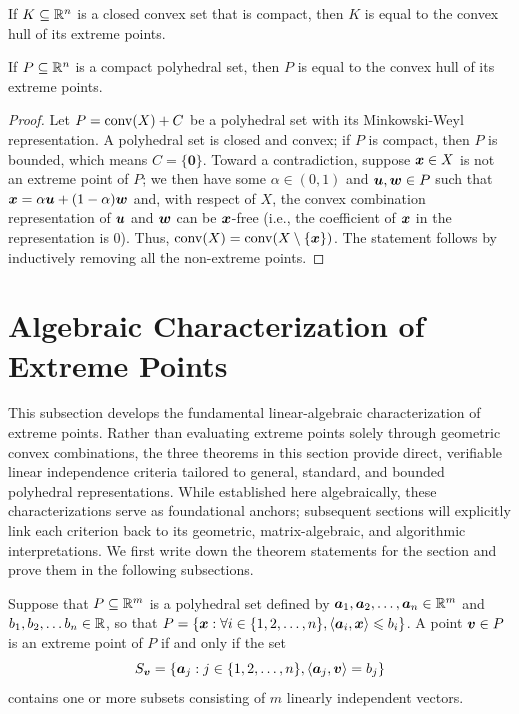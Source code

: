 \begin{proposition}
If $K\subseteq \mathbb R^n$ is a closed convex set that is compact, then $K$ is equal to the convex hull of its extreme points.
\end{proposition}
\begin{corollary}
If $P\subseteq \mathbb R^n$ is a compact polyhedral set, then $P$ is equal to the convex hull of its extreme points.
\end{corollary}
\begin{proof}
Let $P = \operatorname{conv}(X) + C$ be a polyhedral set with its Minkowski-Weyl representation. A polyhedral set is closed and convex; if $P$ is compact, then $P$ is bounded, which means $C = \{\bm0\}$. Toward a contradiction, suppose ${\boldsymbol x} \in X$ is not an extreme point of $P$; we then have some $\alpha\in(0,1)$ and ${\boldsymbol u}, {\boldsymbol w} \in P$ such that ${\boldsymbol x} = \alpha {\boldsymbol u} + (1-\alpha){\boldsymbol w}$ and, with respect of $X$, the convex combination representation of ${\boldsymbol u}$ and ${\boldsymbol w}$ can be ${\boldsymbol x}$-free (i.e., the coefficient of ${\boldsymbol x}$ in the representation is 0). Thus, $\operatorname{conv}(X) = \operatorname{conv}(X\setminus\{{\boldsymbol x}\})$. The statement follows by inductively removing all the non-extreme points.
\end{proof}


\section{Algebraic Characterization of Extreme Points}

This subsection develops the fundamental linear-algebraic characterization of extreme points. Rather than evaluating extreme points solely through geometric convex combinations, the three theorems in this section provide direct, verifiable linear independence criteria tailored to general, standard, and bounded polyhedral representations. While established here algebraically, these characterizations serve as foundational anchors; subsequent sections will explicitly link each criterion back to its geometric, matrix-algebraic, and algorithmic interpretations. We first write down the theorem statements for the section and prove them in the following subsections. 

\begin{theorem}\label{thm: extreme points part 1}
Suppose that $P\subseteq \mathbb R^m$ is a polyhedral set defined by ${\boldsymbol a}_1, {\boldsymbol a}_2, \dots, {\boldsymbol a}_n\in\mathbb R^m$ and $b_1, b_2,\dots b_n\in\mathbb R$, so that $ P = \{{\boldsymbol x}: \forall i\in\{1, 2, \dots, n\}, \left\langle{\boldsymbol a}_i, {\boldsymbol x}\right\rangle\leqslant b_i\}$. A point ${\boldsymbol v}\in P$ is an extreme point of $P$ if and only if the set 
\[S_{\boldsymbol v} = \left\{{\boldsymbol a}_j: j \in \{1, 2, \dots, n\}, \left\langle{\boldsymbol a}_j, {\boldsymbol v}\right\rangle = b_j\right\} \] contains one or more subsets consisting of $m$ linearly independent vectors. 
\end{theorem}

